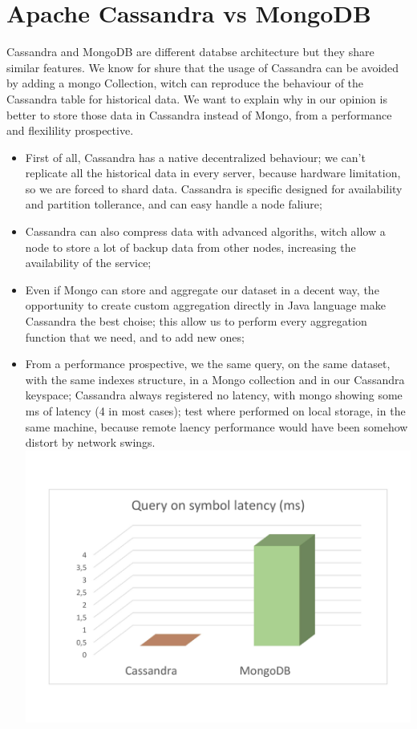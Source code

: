 \section{Apache Cassandra vs MongoDB}
Cassandra and MongoDB are different databse architecture but they share similar features. 
We know for shure that the usage of Cassandra can be avoided by adding a mongo Collection,
witch can reproduce the behaviour of the Cassandra table for historical data. We want to explain
why in our opinion is better to store those data in Cassandra instead of Mongo, from a
performance and flexilility prospective.
\begin{itemize}
    \item 
    First of all, Cassandra has a native decentralized behaviour; we can't replicate all
    the historical data in every server, because hardware limitation, so we are forced to 
    shard data. Cassandra is specific designed for availability and partition tollerance,
    and can easy handle a node faliure;
    \item 
    Cassandra can also compress data with advanced algoriths, witch allow a node to store a lot
    of backup data from other nodes, increasing the availability of the service;
    \item
    Even if Mongo can store and aggregate our dataset in a decent way, the opportunity to
    create custom aggregation directly in Java language make Cassandra the best choise; this 
    allow us to perform every aggregation function that we need, and to add new ones;
    \item
    From a performance prospective, we the same query, on the same dataset, with the same 
    indexes structure, in a Mongo collection and in our Cassandra keyspace; Cassandra
    always registered no latency, with mongo showing some ms of latency (4 in most cases);
    test where performed on local storage, in the same machine,
    because remote laency performance would have been 
    somehow distort by network swings.\\
    \includegraphics[scale=0.16]{img/cassandra_vs_mongoDB.png}\\

\end{itemize}